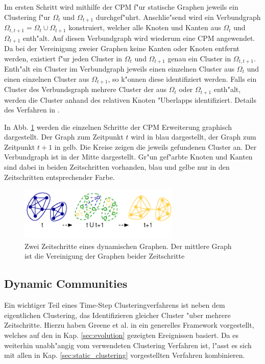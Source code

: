 \documentclass[journal]{vgtc}
\begin{document}
    Im ersten Schritt wird mithilfe der CPM f"ur statische Graphen jeweils ein Clustering f"ur $\Omega_{t}$ und $\Omega_{t+1}$ durchgef"uhrt.
    Anschlie"send wird ein Verbundgraph $\Omega_{t,t+1} = \Omega_{t} \cup \Omega_{t+1}$ konstruiert, welcher alle Knoten und Kanten aus
    $\Omega_t$ und $\Omega_{t+1}$ enth"alt. Auf diesen Verbundgraph wird wiederum eine CPM angewendet. Da bei der Vereinigung zweier Graphen
    keine Kanten oder Knoten entfernt werden, existiert f"ur jeden Cluster in $\Omega_t$ und $\Omega_{t+1}$ genau ein Cluster in $\Omega_{t,t+1}$.
    Enth"alt ein Cluster im Verbundgraph jeweils einen einzelnen Cluster aus $\Omega_t$ und einen einzelnen Cluster aus $\Omega_{t+1}$,
    so k"onnen diese identifiziert werden. Falls ein Cluster des Verbundsgraph mehrere Cluster der aus $\Omega_t$ oder $\Omega_{t+1}$
    enth"alt, werden die Cluster anhand des relativen Knoten "Uberlapps identifiziert. Details des Verfahren in \cite{CPM_time}.
    
    In Abb. \ref{fig:CPM_time} werden die einzelnen Schritte der CPM Erweiterung graphisch dargestellt. Der Graph zum Zeitpunkt $t$ wird
    in blau dargestellt, der Graph zum Zeitpunkt $t+1$ in gelb. Die Kreise zeigen die jeweils gefundenen Cluster an. Der Verbundgraph ist
    in der Mitte dargestellt. Gr"un gef"arbte Knoten und Kanten sind dabei in beiden Zeitschritten vorhanden, blau und gelbe nur in den
    Zeitschritten entsprechender Farbe.
    
    \begin{figure}[h]
      \centering
      \includegraphics[width=3in]{images/CPM_time}
      \caption{\label{fig:CPM_time} Zwei Zeitschritte eines dynamischen Graphen. Der mittlere Graph ist die Vereinigung der Graphen beider Zeitschritte \cite{CPM_time}}
    \end{figure}

    
  \subsection{Dynamic Communities}
    Ein wichtiger Teil eines Time-Step Clusteringverfahrens ist neben dem eigentlichen Clustering, das Identifizieren gleicher Cluster
    "uber mehrere Zeitschritte. Hierzu haben Greene et al. in \cite{timestep} ein generelles Framework vorgestellt, welches auf den
    in Kap. \ref{sec:evolution} gezeigten Ereignissen basiert. Da es weiterhin unabh"angig vom verwendeten Clustering Verfahren ist,
    l"asst es sich mit allen in Kap. \ref{sec:static_clustering} vorgestellten Verfahren kombinieren.
    
\end{document}
